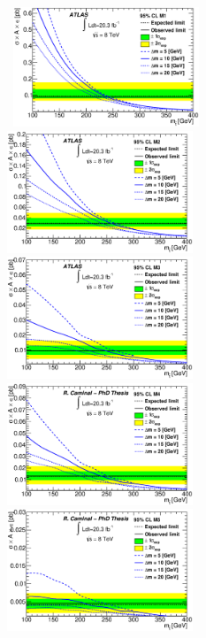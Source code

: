 \begin{figure}[!ht]
  \begin{center}
    \mbox{
      \includegraphics[width=0.495\textwidth]{MonojetAnalysis/Figures/ModelIndependent_Stop_M1.eps}
      \includegraphics[width=0.495\textwidth]{MonojetAnalysis/Figures/ModelIndependent_Stop_M2.eps}
    }
    \mbox{
      \includegraphics[width=0.495\textwidth]{MonojetAnalysis/Figures/ModelIndependent_Stop_M3.eps}
      \includegraphics[width=0.495\textwidth]{MonojetAnalysis/Figures/ModelIndependent_Stop_M4.eps}
    }
    \mbox{
      \includegraphics[width=0.495\textwidth]{MonojetAnalysis/Figures/ModelIndependent_Stop_M5.eps}
}
\end{center}
\end{figure}
